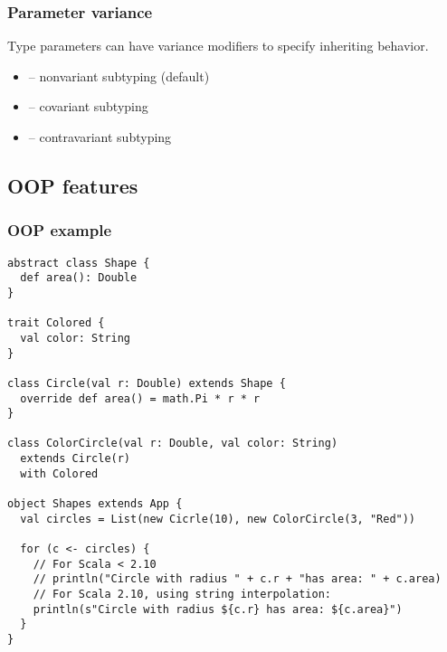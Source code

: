 \begin{frame}[fragile]
\frametitle{Parameter variance}
Type parameters can have variance modifiers to specify inheriting behavior.
\begin{itemize}
\item {} -- nonvariant subtyping (default)
\item {} -- covariant subtyping
\item {} -- contravariant subtyping
\end{itemize}

\end{frame}

\subsection{OOP features}

\begin{frame}[fragile]
\frametitle{OOP example}

\begin{lstlisting}
abstract class Shape {
  def area(): Double
}

trait Colored {
  val color: String
}

class Circle(val r: Double) extends Shape {
  override def area() = math.Pi * r * r
}

class ColorCircle(val r: Double, val color: String) 
  extends Circle(r) 
  with Colored

object Shapes extends App {
  val circles = List(new Cicrle(10), new ColorCircle(3, "Red"))

  for (c <- circles) {
    // For Scala < 2.10
    // println("Circle with radius " + c.r + "has area: " + c.area)
    // For Scala 2.10, using string interpolation:
    println(s"Circle with radius ${c.r} has area: ${c.area}")
  }
}

\end{lstlisting}
\end{frame}

